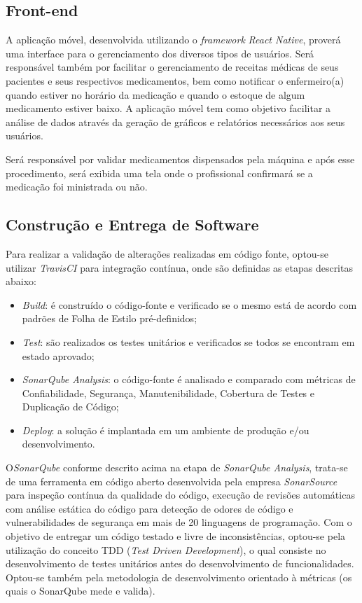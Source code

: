 \subsection{Front-end}
A aplicação móvel, desenvolvida utilizando o \emph{framework} \textit{React Native}, proverá uma interface para o gerenciamento dos diversos tipos de usuários. Será responsável também por facilitar o gerenciamento de receitas médicas de seus pacientes e seus respectivos medicamentos, bem como notificar o enfermeiro(a) quando estiver no horário da medicação e quando o estoque de algum medicamento estiver baixo. A aplicação móvel tem como objetivo facilitar a análise de dados através da geração de gráficos e relatórios necessários aos seus usuários. 

Será responsável por validar medicamentos dispensados pela máquina e após esse procedimento, será exibida uma tela onde o profissional confirmará se a medicação foi ministrada ou não.


\subsection{Construção e Entrega de Software}
Para realizar a validação de alterações realizadas em código fonte, optou-se utilizar \textit{TravisCI} para integração contínua, onde são definidas as etapas descritas abaixo:

\begin{itemize}
    \item \emph{Build}: é construído o código-fonte e verificado se o mesmo está de acordo com padrões de Folha de Estilo pré-definidos;
    \item  \emph{Test}: são realizados os testes unitários e verificados se todos se encontram em estado aprovado;
    \item  \emph{SonarQube Analysis}: o código-fonte é analisado e comparado com métricas de Confiabilidade, Segurança, Manutenibilidade, Cobertura de Testes e Duplicação de Código;
    \item  \emph{Deploy}: a solução é implantada em um ambiente de produção e/ou desenvolvimento. 
\end{itemize}

O\textit{SonarQube} conforme descrito acima na etapa de \textit{SonarQube Analysis}, trata-se de uma ferramenta em código aberto desenvolvida pela empresa \textit{SonarSource} para inspeção contínua da qualidade do código, execução de revisões automáticas com análise estática do código para detecção de odores de código e vulnerabilidades de segurança em mais de 20 linguagens de programação. Com o objetivo de entregar um código testado e livre de inconsistências, optou-se pela utilização do conceito TDD (\emph{Test Driven Development}), o qual consiste no desenvolvimento de testes unitários antes do desenvolvimento de funcionalidades. Optou-se também pela metodologia de desenvolvimento orientado à métricas (os quais o SonarQube mede e valida).

